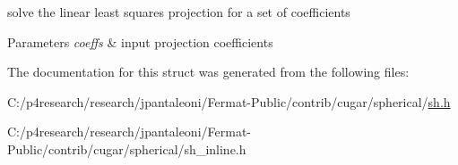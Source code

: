 solve the linear least squares projection for a set of coefficients


\begin{DoxyParams}{Parameters}
{\em coeffs} & input projection coefficients \\
\hline
\end{DoxyParams}


The documentation for this struct was generated from the following files\+:\begin{DoxyCompactItemize}
\item 
C\+:/p4research/research/jpantaleoni/\+Fermat-\/\+Public/contrib/cugar/spherical/\hyperlink{sh_8h}{sh.\+h}\item 
C\+:/p4research/research/jpantaleoni/\+Fermat-\/\+Public/contrib/cugar/spherical/sh\+\_\+inline.\+h\end{DoxyCompactItemize}
